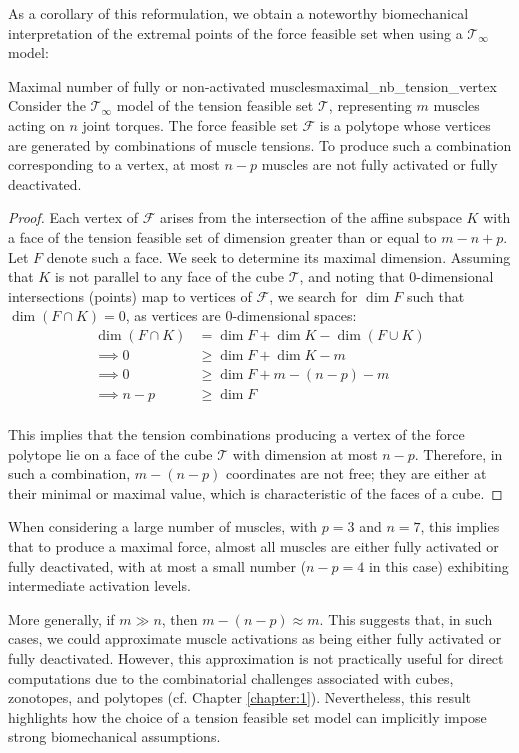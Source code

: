 As a corollary of this reformulation, we obtain a noteworthy biomechanical interpretation of the extremal points of the force feasible set when using a $\mathcal{T}_{\infty}$ model:
\begin{lemmabox}{Maximal number of fully or non-activated muscles}{maximal_nb_tension_vertex}
  Consider the $\mathcal{T}_{\infty}$ model of the tension feasible set $\mathcal{T}$, representing $m$ muscles acting on $n$ joint torques. The force feasible set $\mathcal{F}$ is a polytope whose vertices are generated by combinations of muscle tensions. To produce such a combination corresponding to a vertex, at most $n-p$ muscles are not fully activated or fully deactivated.
\end{lemmabox}
\begin{proof}
  Each vertex of $\mathcal{F}$ arises from the intersection of the affine subspace $K$ with a face of the tension feasible set of dimension greater than or equal to $m-n+p$. Let $F$ denote such a face. We seek to determine its maximal dimension. Assuming that $K$ is not parallel to any face of the cube $\mathcal{T}$, and noting that 0-dimensional intersections (points) map to vertices of $\mathcal{F}$, we search for $\dim F$ such that $\dim (F \cap K) = 0$, as vertices are 0-dimensional spaces:
  \begin{align*}
    \dim (F\cap K) & = \dim F + \dim K - \dim (F\cup K) \\
    \implies 0 &\geq \dim F + \dim K - m \\
    \implies 0 &\geq \dim F + m-(n-p) - m\\
    \implies n-p &\geq \dim F\\
  \end{align*}

  This implies that the tension combinations producing a vertex of the force polytope lie on a face of the cube $\mathcal{T}$ with dimension at most $n-p$. Therefore, in such a combination, $m-(n-p)$ coordinates are not free; they are either at their minimal or maximal value, which is characteristic of the faces of a cube.
\end{proof}

When considering a large number of muscles, with $p=3$ and $n=7$, this implies that to produce a maximal force, almost all muscles are either fully activated or fully deactivated, with at most a small number ($n-p = 4$ in this case) exhibiting intermediate activation levels.

More generally, if $m \gg n$, then $m - (n - p) \approx m$. This suggests that, in such cases, we could approximate muscle activations as being either fully activated or fully deactivated. However, this approximation is not practically useful for direct computations due to the combinatorial challenges associated with cubes, zonotopes, and polytopes (cf. Chapter \ref{chapter:1}). Nevertheless, this result highlights how the choice of a tension feasible set model can implicitly impose strong biomechanical assumptions. 


